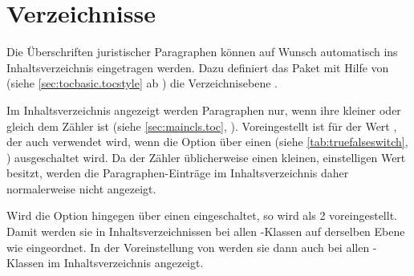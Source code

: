 

\section{Verzeichnisse}

Die Überschriften juristischer Paragraphen können auf Wunsch automatisch
ins Inhaltsverzeichnis eingetragen
werden. Dazu definiert das Paket mit Hilfe
von  (siehe
\autoref{sec:tocbasic.tocstyle} ab
)
die Verzeichnisebene .

\begin{Declaration}
\end{Declaration}
Im Inhaltsverzeichnis angezeigt werden
Paragraphen nur, wenn ihre 
kleiner oder gleich dem Zähler %
 ist
(siehe \autoref{sec:maincls.toc},
). Voreingestellt
ist für  der Wert , der auch verwendet
wird, wenn die Option über einen
 (siehe
\autoref{tab:truefalseswitch}, )
ausgeschaltet wird. Da der Zähler 
üblicherweise einen kleinen, einstelligen Wert besitzt, werden die
Paragraphen-Einträge im Inhaltsverzeichnis daher normalerweise nicht
angezeigt.

Wird die Option hingegen über einen
 eingeschaltet,
so wird als  2 voreingestellt. Damit werden sie in
Inhaltsverzeichnissen bei allen \KOMAScript-Klassen auf derselben Ebene wie
%
 eingeordnet. In der
Voreinstellung von  werden sie dann auch bei
allen \KOMAScript-Klassen im Inhaltsverzeichnis angezeigt.

